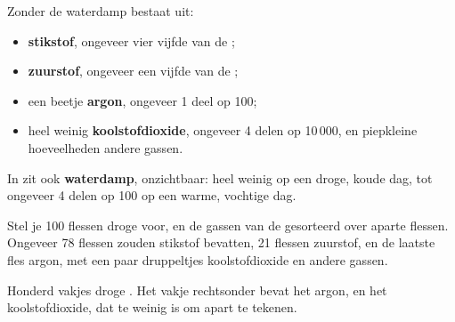 \begin{proposition}\label{prop:g4:air-a-mixture-of-gases:composition}
Zonder de waterdamp bestaat  uit:
\begin{itemize}
  \item \textbf{stikstof}, ongeveer vier vijfde van de ;
  \item \textbf{zuurstof}, ongeveer een vijfde van de ;
  \item een beetje \textbf{argon}, ongeveer 1 deel op 100;
  \item heel weinig \textbf{koolstofdioxide}, ongeveer 4 delen op
        10\,000, en piepkleine hoeveelheden andere gassen.
\end{itemize}
In  zit ook \textbf{waterdamp}, onzichtbaar: heel weinig op een
droge, koude dag, tot ongeveer 4 delen op 100 op een warme, vochtige dag.
\end{proposition}

\begin{example}\label{ex:g4:air-a-mixture-of-gases:hundred}
Stel je 100 flessen droge  voor, en de gassen van de 
gesorteerd over aparte flessen. Ongeveer 78 flessen zouden stikstof
bevatten, 21 flessen zuurstof, en de laatste fles argon, met een paar
druppeltjes koolstofdioxide en andere gassen.
\end{example}

\begin{omfigure}

{\small Honderd vakjes droge . Het vakje rechtsonder bevat het
argon, en het koolstofdioxide, dat te weinig is om apart te tekenen.}
\end{omfigure}

